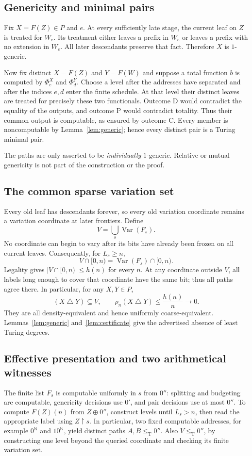 \documentclass[11pt,a4paper]{article}
\newcommand{\N}{\mathbb N}
\newcommand{\leT}{\leq_{\mathrm T}}
\newcommand{\Var}{\operatorname{Var}}
\newcommand{\restr}{\mathbin{\upharpoonright}}
\theoremstyle{definition}\newtheorem{definition}[theorem]{Definition}
\theoremstyle{remark}\newtheorem{remark}[theorem]{Remark}
\begin{document}
\subsection{Genericity and minimal pairs}
Fix $X=F(Z)\in P$ and $e$. At every sufficiently late stage, the current leaf
on $Z$ is treated for $W_e$. Its treatment either leaves a prefix in $W_e$ or
leaves a prefix with no extension in $W_e$. All later descendants preserve
that fact. Therefore $X$ is $1$-generic.

Now fix distinct $X=F(Z)$ and $Y=F(W)$ and suppose a total function $b$ is
computed by $\Phi_e^X$ and $\Phi_d^Y$. Choose a level after the addresses
have separated and after the indices $e,d$ enter the finite schedule. At
that level their distinct leaves are treated for precisely these two
functionals. Outcome D would contradict the equality of the outputs, and
outcome P would contradict totality. Thus their common output is computable,
as ensured by outcome C. Every member is noncomputable by
Lemma~\ref{lem:generic}; hence every distinct pair is a Turing minimal pair.

The paths are only asserted to be \emph{individually} $1$-generic. Relative
or mutual genericity is not part of the construction or the proof.

\subsection{The common sparse variation set}
Every old leaf has descendants forever, so every old variation coordinate
remains a variation coordinate at later frontiers. Define
\[
                         V=\bigcup_s\Var(F_s).
\]
No coordinate can begin to vary after its bits have already been frozen
on all current leaves. Consequently, for $L_s\ge n$,
\[
               V\cap[0,n)=\Var(F_s)\cap[0,n).
\]
Legality gives $|V\cap[0,n)|\le h(n)$ for every $n$.
At any coordinate outside $V$, all labels long enough to cover that
coordinate have the same bit; thus all paths agree there. In particular,
for any $X,Y\in P$,
\[
       (X\mathbin\triangle Y)\subseteq V,
       \qquad\rho_n(X\mathbin\triangle Y)\le\frac{h(n)}n\longrightarrow0.
\]
They are all density-equivalent and hence uniformly coarse-equivalent.
Lemmas~\ref{lem:generic} and~\ref{lem:certificate} give the advertised absence
of least Turing degrees.

\subsection{Effective presentation and two arithmetical witnesses}
The finite list $F_s$ is computable uniformly in $s$ from $0''$: splitting and
budgeting are computable, genericity decisions use $0'$, and pair decisions
use at most $0''$. To compute $F(Z)(n)$ from $Z\oplus0''$, construct levels
until $L_s>n$, then read the appropriate label using $Z\restr s$.
In particular, two fixed computable addresses, for example $0^\N$ and
$10^\N$, yield distinct paths $A,B\leT0''$. Also $V\leT0''$, by constructing
one level beyond the queried coordinate and checking its finite variation set.
\end{document}
